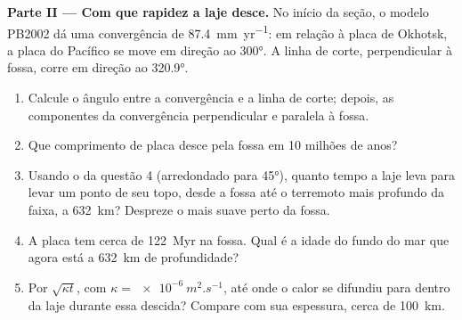 \begin{problem}
\medskip
\noindent\textbf{Parte II --- Com que rapidez a laje desce.} No início da seção, o modelo PB2002 dá uma convergência de \qty{87.4}{mm.yr^{-1}}: em relação à placa de Okhotsk, a placa do Pacífico se move em direção ao  \ang{300}. A linha de corte, perpendicular à fossa, corre em direção ao  \ang{320.9}.
\begin{enumerate}[resume]
  \item Calcule o ângulo entre a convergência e a linha de corte; depois, as componentes da convergência perpendicular e paralela à fossa.
  \item Que comprimento de placa desce pela fossa em 10 milhões de anos?
  \item Usando o  da questão 4 (arredondado para \ang{45}), quanto tempo a laje leva para levar um ponto de seu topo, desde a fossa até o terremoto mais profundo da faixa, a \qty{632}{km}? Despreze o  mais suave perto da fossa.
  \item A placa tem cerca de \qty{122}{Myr} na fossa. Qual é a idade do fundo do mar que agora está a \qty{632}{km} de profundidade?
  \item Por $\sqrt{\kappa t}$, com $\kappa = \qty{e-6}{m^2.s^{-1}}$, até onde o calor se difundiu para dentro da laje durante essa descida? Compare com sua espessura, cerca de \qty{100}{km}.
\end{enumerate}


\end{problem}
